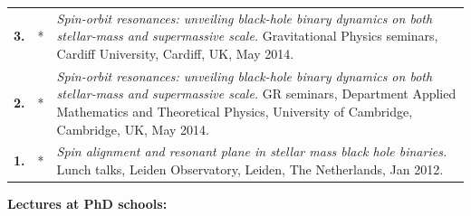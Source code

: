 {\begin{longtable}{rp{0.3cm}p{15.8cm}}
%
\textbf{3.} & * & \textit{Spin-orbit resonances: unveiling black-hole binary dynamics on both stellar-mass and supermassive scale.}
\newline{}
Gravitational Physics seminars, Cardiff University, Cardiff, UK, May 2014.
\vspace{0.05cm}\\
%
\textbf{2.} & * & \textit{Spin-orbit resonances: unveiling black-hole binary dynamics on both stellar-mass and supermassive scale.}
\newline{}
GR seminars, Department Applied Mathematics and Theoretical Physics, University of Cambridge, Cambridge, UK, May 2014.
\vspace{0.05cm}\\
%
\textbf{1.} & * & \textit{Spin alignment and resonant plane in stellar mass black hole binaries.}
\newline{}
Lunch talks, Leiden Observatory, Leiden, The Netherlands, Jan 2012.
\vspace{0.05cm}\\
%
\end{longtable} }
\textcolor{color1}{\textbf{Lectures at PhD schools:}}
\vspace{-0.5cm}

